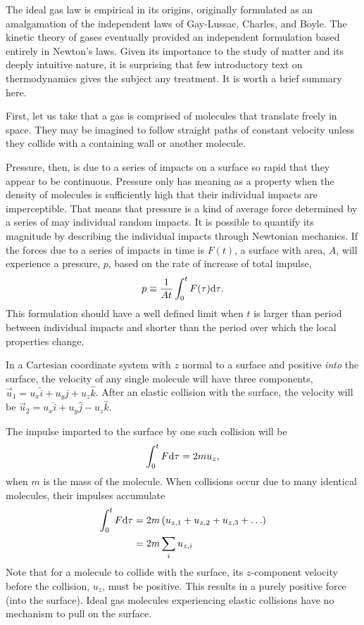 The ideal gas law is empirical in its origins, originally formulated as an amalgamation of the independent laws of Gay-Lussac, Charles, and Boyle.  The kinetic theory of gases eventually provided an independent formulation based entirely in Newton's laws.  Given its importance to the study of matter and its deeply intuitive nature, it is surprising that few introductory text on thermodynamics gives the subject any treatment.  It is worth a brief summary here.

First, let us take that a gas is comprised of molecules that translate freely in space.  They may be imagined to follow straight paths of constant velocity unless they collide with a containing wall or another molecule.  

Pressure, then, is due to a series of impacts on a surface so rapid that they appear to be continuous.  Pressure only has meaning as a property when the density of molecules is sufficiently high that their individual impacts are imperceptible.  That means that pressure is a kind of average force determined by a series of may individual random impacts.  It is possible to quantify its magnitude by describing the individual impacts through Newtonian mechanics.  If the forces due to a series of impacts in time is $F(t)$, a surface with area, $A$, will experience a pressure, $p$, based on the rate of increase of total impulse,
\begin{align}
p \equiv \frac{1}{A t} \int_0^t F(\tau) \mathrm{d} \tau.
\end{align}
This formulation should have a well defined limit when $t$ is larger than period between individual impacts and shorter than the period over which the local properties change.

In a Cartesian coordinate system with $z$ normal to a surface and positive \emph{into} the surface, the velocity of any single molecule will have three components, $\vec{u}_1 = u_x \hat{i} + u_y \hat{j} + u_z \hat{k}$.  After an elastic collision with the surface, the velocity will be $\vec{u}_2 = u_x \hat{i} + u_y \hat{j} - u_z \hat{k}$.

The impulse imparted to the surface by one such collision will be
\begin{align}
\int_0^t F \mathrm{d} \tau = 2 m u_z,
\end{align}
when $m$ is the mass of the molecule.  When collisions occur due to many identical molecules, their impulses accumulate
\begin{align}
\int_0^t F \mathrm{d} \tau &= 2 m \left( u_{z,1} + u_{z,2} + u_{z,3} + \ldots \right)\nonumber\\
  &= 2 m \sum_i u_{z,i}
\end{align}
Note that for a molecule to collide with the surface, its $z$-component velocity before the collision, $u_z$, must be positive.  This results in a purely positive force (into the surface).  Ideal gas molecules experiencing elastic collisions have no mechanism to pull on the surface.

